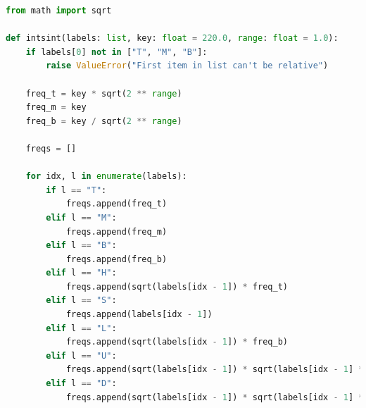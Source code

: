\begin{lstlisting}[caption=Gerador de f0 a partir do modelo INTSINT, label=intsintpy, language=Python]
from math import sqrt

def intsint(labels: list, key: float = 220.0, range: float = 1.0):
    if labels[0] not in ["T", "M", "B"]:
        raise ValueError("First item in list can't be relative")

    freq_t = key * sqrt(2 ** range)
    freq_m = key
    freq_b = key / sqrt(2 ** range)

    freqs = []

    for idx, l in enumerate(labels):
        if l == "T":
            freqs.append(freq_t)
        elif l == "M":
            freqs.append(freq_m)
        elif l == "B":
            freqs.append(freq_b)
        elif l == "H":
            freqs.append(sqrt(labels[idx - 1]) * freq_t)
        elif l == "S":
            freqs.append(labels[idx - 1])
        elif l == "L":
            freqs.append(sqrt(labels[idx - 1]) * freq_b)
        elif l == "U":
            freqs.append(sqrt(labels[idx - 1]) * sqrt(labels[idx - 1] * freq_t))
        elif l == "D":
            freqs.append(sqrt(labels[idx - 1]) * sqrt(labels[idx - 1] * freq_b))
\end{lstlisting}

